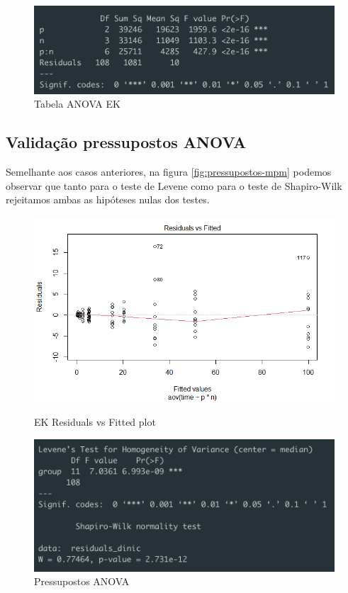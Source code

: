 \documentclass{uofa-eng-assignment}
\begin{document}
\begin{figure}[h]
    \centering
    \includegraphics[width=0.7\linewidth]{ek-anova.png}
    \caption{Tabela ANOVA EK}
    \label{fig:anova-ek}
\end{figure}

\subsection{Validação pressupostos ANOVA}

Semelhante aos casos anteriores, na figura \ref{fig:pressupostos-mpm} podemos observar que tanto para o teste de Levene como para o teste de Shapiro-Wilk rejeitamos ambas as hipóteses nulas dos testes. 

\begin{figure}[h]
    \centering
    \begin{minipage}{0.45\textwidth}
        \centering
        \includegraphics[width=1\textwidth]{res_plot_ek.png}
        \caption{EK Residuals vs Fitted plot}
        \label{fig:resplot-ek}
    \end{minipage}
    \hfill
    \begin{minipage}{0.45\textwidth}
        \centering
        \includegraphics[width=1\textwidth]{pressupostos_ek.png}
        \caption{Pressupostos ANOVA}
        \label{fig:prssupostos-ek}
    \end{minipage}
\end{figure}
\end{document}
